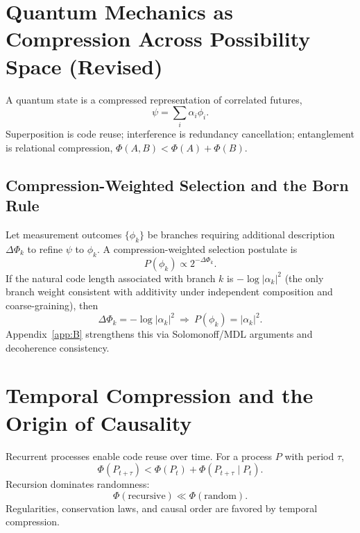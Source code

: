 \documentclass[aps,preprint,onecolumn,longbibliography,nofootinbib]{revtex4-2}
\numberwithin{equation}{section}        %
\begin{document}
\section{Quantum Mechanics as Compression Across Possibility Space (Revised)}
A quantum state is a compressed representation of correlated futures,
\begin{equation}
\psi = \sum_i \alpha_i \phi_i. \label{eq:super}
\end{equation}
Superposition is code reuse; interference is redundancy cancellation; entanglement is relational compression, $\Phi(A,B) < \Phi(A)+\Phi(B)$.

\subsection{Compression-Weighted Selection and the Born Rule}
Let measurement outcomes $\{\phi_k\}$ be branches requiring additional description $\Delta\Phi_k$ to refine $\psi$ to $\phi_k$. A compression-weighted selection postulate is
\begin{equation}
P(\phi_k)\propto 2^{-\Delta\Phi_k}. \label{eq:compprior}
\end{equation}
If the natural code length associated with branch $k$ is $-\log|\alpha_k|^2$ (the only branch weight consistent with additivity under independent composition and coarse-graining), then
\begin{equation}
\Delta\Phi_k = -\log|\alpha_k|^2 \ \Rightarrow\ P(\phi_k)=|\alpha_k|^2. \label{eq:born}
\end{equation}
Appendix~\ref{app:B} strengthens this via Solomonoff/MDL arguments and decoherence consistency.

\section{Temporal Compression and the Origin of Causality}
Recurrent processes enable code reuse over time. For a process $P$ with period $\tau$,
\begin{equation}
\Phi(P_{t+\tau}) < \Phi(P_t) + \Phi(P_{t+\tau}\mid P_t). \label{eq:loop}
\end{equation}
Recursion dominates randomness:
\begin{equation}
\Phi(\text{recursive}) \ll \Phi(\text{random}). \label{eq:recur}
\end{equation}
Regularities, conservation laws, and causal order are favored by temporal compression.
\end{document}

